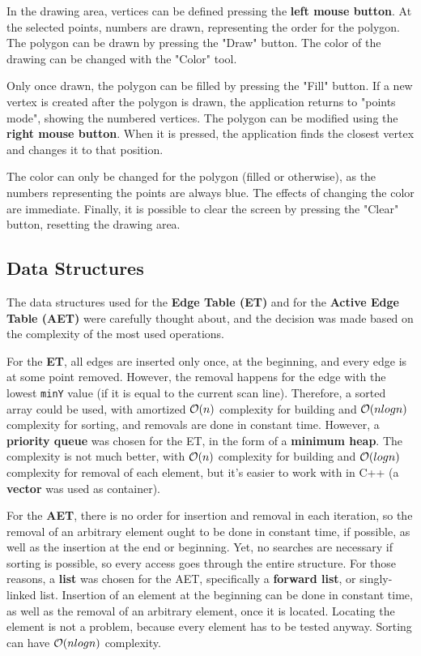 \documentclass[12pt]{article}
\begin{document}
In the drawing area, vertices can be defined pressing the \textbf{left mouse button}. At the selected points, numbers are drawn, representing the order for the polygon. The polygon can be drawn by pressing the "Draw" button. The color of the drawing can be changed with the "Color" tool.

Only once drawn, the polygon can be filled by pressing the "Fill" button. If a new vertex is created after the polygon is drawn, the application returns to "points mode", showing the numbered vertices. The polygon can be modified using the \textbf{right mouse button}. When it is pressed, the application finds the closest vertex and changes it to that position.

The color can only be changed for the polygon (filled or otherwise), as the numbers representing the points are always blue. The effects of changing the color are immediate. Finally, it is possible to clear the screen by pressing the "Clear" button, resetting the drawing area.

\subsection{Data Structures}
The data structures used for the \textbf{Edge Table (ET)} and for the \textbf{Active Edge Table (AET)} were carefully thought about, and the decision was made based on the complexity of the most used operations.

For the \textbf{ET}, all edges are inserted only once, at the beginning, and every edge is at some point removed. However, the removal happens for the edge with the lowest \texttt{minY} value (if it is equal to the current scan line). Therefore, a sorted array could be used, with amortized $\operatorname{\mathcal{O}}(n)$ complexity for building and $\operatorname{\mathcal{O}}(nlogn)$ complexity for sorting, and removals are done in constant time. However, a \textbf{priority queue} was chosen for the ET, in the form of a \textbf{minimum heap}. The complexity is not much better, with $\operatorname{\mathcal{O}}(n)$ complexity for building and $\operatorname{\mathcal{O}}(logn)$ complexity for removal of each element, but it's easier to work with in C++ (a \textbf{vector} was used as container).

For the \textbf{AET}, there is no order for insertion and removal in each iteration, so the removal of an arbitrary element ought to be done in constant time, if possible, as well as the insertion at the end or beginning. Yet, no searches are necessary if sorting is possible, so every access goes through the entire structure. For those reasons, a \textbf{list} was chosen for the AET, specifically a \textbf{forward list}, or singly-linked list. Insertion of an element at the beginning can be done in constant time, as well as the removal of an arbitrary element, once it is located. Locating the element is not a problem, because every element has to be tested anyway. Sorting can have $\operatorname{\mathcal{O}}(nlogn)$ complexity.
\end{document}
